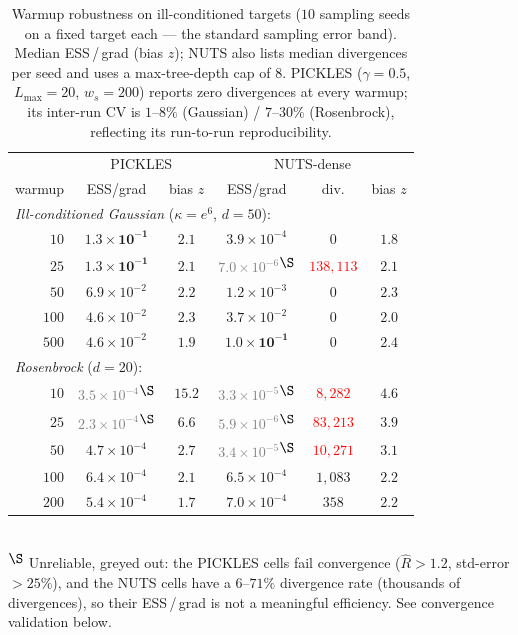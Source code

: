 \documentclass{article}
\begin{document}
\begin{table}[h]
\centering
\caption{Warmup robustness on ill-conditioned targets ($10$ sampling
seeds on a fixed target each --- the standard sampling error band).
Median ESS\,/\,grad (bias $z$); NUTS also lists median divergences per
seed and uses a max-tree-depth cap of $8$. PICKLES ($\gamma{=}0.5$,
$L_{\max}{=}20$, $w_s{=}200$) reports zero divergences at every warmup;
its inter-run CV is $1$--$8\%$ (Gaussian) / $7$--$30\%$ (Rosenbrock),
reflecting its run-to-run reproducibility.}
\label{tab:warmupRobust}
\small
\begin{tabular}{r cc | ccc}
\toprule
& \multicolumn{2}{c|}{PICKLES} & \multicolumn{3}{c}{NUTS-dense} \\
warmup & ESS/grad & bias $z$ & ESS/grad & div. & bias $z$ \\
\midrule
\multicolumn{6}{l}{\emph{Ill-conditioned Gaussian} ($\kappa=e^6$, $d{=}50$):} \\
$10$  & $\mathbf{1.3\!\times\!10^{-1}}$ & $2.1$ & $3.9\!\times\!10^{-4}$ & $0$ & $1.8$ \\
$25$  & $\mathbf{1.3\!\times\!10^{-1}}$ & $2.1$ & \textcolor{gray}{$7.0\!\times\!10^{-6}$}\textsuperscript{$\S$} & \textcolor{red}{$138{,}113$} & $2.1$ \\
$50$  & $6.9\!\times\!10^{-2}$ & $2.2$ & $1.2\!\times\!10^{-3}$ & $0$ & $2.3$ \\
$100$ & $4.6\!\times\!10^{-2}$ & $2.3$ & $3.7\!\times\!10^{-2}$ & $0$ & $2.0$ \\
$500$ & $4.6\!\times\!10^{-2}$ & $1.9$ & $\mathbf{1.0\!\times\!10^{-1}}$ & $0$ & $2.4$ \\
\midrule
\multicolumn{6}{l}{\emph{Rosenbrock} ($d{=}20$):} \\
$10$  & \textcolor{gray}{$3.5\!\times\!10^{-4}$}\textsuperscript{$\S$} & $15.2$ & \textcolor{gray}{$3.3\!\times\!10^{-5}$}\textsuperscript{$\S$} & \textcolor{red}{$8{,}282$} & $4.6$ \\
$25$  & \textcolor{gray}{$2.3\!\times\!10^{-4}$}\textsuperscript{$\S$} & $6.6$ & \textcolor{gray}{$5.9\!\times\!10^{-6}$}\textsuperscript{$\S$} & \textcolor{red}{$83{,}213$} & $3.9$ \\
$50$  & $4.7\!\times\!10^{-4}$ & $2.7$ & \textcolor{gray}{$3.4\!\times\!10^{-5}$}\textsuperscript{$\S$} & \textcolor{red}{$10{,}271$} & $3.1$ \\
$100$ & $6.4\!\times\!10^{-4}$ & $2.1$ & $6.5\!\times\!10^{-4}$ & $1{,}083$ & $2.2$ \\
$200$ & $5.4\!\times\!10^{-4}$ & $1.7$ & $7.0\!\times\!10^{-4}$ & $358$ & $2.2$ \\
\bottomrule
\end{tabular}
\\[2pt]
{\footnotesize \textsuperscript{$\S$} Unreliable, greyed out: the PICKLES
cells fail convergence ($\hat R>1.2$, std-error $>25\%$), and the NUTS
cells have a $6$--$71\%$ divergence rate (thousands of divergences), so
their ESS\,/\,grad is not a meaningful efficiency. See convergence
validation below.}
\end{table}
\end{document}
